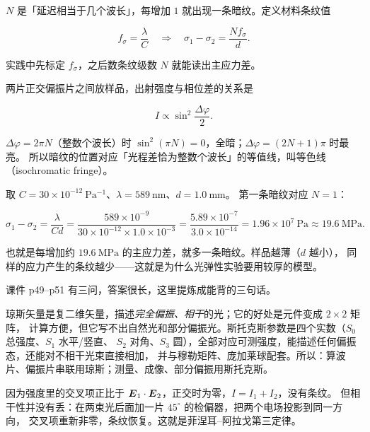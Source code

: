 \documentclass[11pt]{ctexart}
\let\subhdrtheme\subhdr
\renewcommand{\subhdr}[1]{\needspace{4\baselineskip}\subhdrtheme{#1}}
\let\hdrorig\hdr
\renewcommand{\hdr}[2]{\needspace{11\baselineskip}\hdrorig{#1}{#2}}
\begin{document}
$N$ 是「延迟相当于几个波长」，每增加 $1$ 就出现一条暗纹。定义材料条纹值

\[
f_\sigma=\frac{\lambda}{C}
\quad\Longrightarrow\quad
\sigma_1-\sigma_2=\frac{Nf_\sigma}{d}.
\]

实践中先标定 $f_\sigma$，之后数条纹级数 $N$ 就能读出主应力差。


两片正交偏振片之间放样品，出射强度与相位差的关系是

\[
I\propto\sin^2\frac{\Delta\varphi}{2}.
\]

$\Delta\varphi=2\pi N$（整数个波长）时 $\sin^2(\pi N)=0$，全暗；$\Delta\varphi=(2N+1)\pi$ 时最亮。
所以暗纹的位置对应「光程差恰为整数个波长」的等值线，叫等色线（isochromatic fringe）。


取 $C=30\times10^{-12}\ \mathrm{Pa^{-1}}$、$\lambda=589\ \mathrm{nm}$、$d=1.0\ \mathrm{mm}$。
第一条暗纹对应 $N=1$：

\[
\sigma_1-\sigma_2=\frac{\lambda}{Cd}
=\frac{589\times10^{-9}}{30\times10^{-12}\times1.0\times10^{-3}}
=\frac{5.89\times10^{-7}}{3.0\times10^{-14}}
=1.96\times10^{7}\ \mathrm{Pa}\approx19.6\ \mathrm{MPa}.
\]

也就是每增加约 $19.6\ \mathrm{MPa}$ 的主应力差，就多一条暗纹。样品越薄（$d$ 越小），
同样的应力产生的条纹越少——这就是为什么光弹性实验要用较厚的模型。


课件 p49--p51 有三问，答案很长，这里提炼成能背的三句话。


琼斯矢量是复二维矢量，描述\emph{完全偏振、相干}的光；它的好处是元件变成 $2\times2$ 矩阵，
计算方便，但它写不出自然光和部分偏振光。斯托克斯参数是四个实数（$S_0$ 总强度、$S_1$ 水平/竖直、
$S_2$ 对角、$S_3$ 圆），全部对应可测强度，能描述任何偏振态，还能对不相干光束直接相加，
并与穆勒矩阵、庞加莱球配套。所以：算波片、偏振片串联用琼斯；测量、成像、部分偏振用斯托克斯。


因为强度里的交叉项正比于 $\boldsymbol{E}_1\cdot\boldsymbol{E}_2$，正交时为零，$I=I_1+I_2$，没有条纹。
但相干性并没有丢：在两束光后面加一片 $45^\circ$ 的检偏器，把两个电场投影到同一方向，
交叉项重新非零，条纹恢复。这就是菲涅耳--阿拉戈第三定律。
\end{document}
